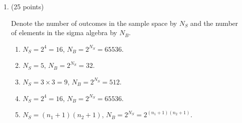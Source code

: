 \documentclass[12pt]{article}
\begin{document}
\begin{enumerate}
\item (25 points)

Denote the number of outcomes in the sample space
by $N_S$ and the number of elements in the sigma algebra by $N_B$.
\begin{enumerate}
\item
$N_S = 2^4 = 16$,
$N_B = 2^{N_S} = 65536$.

\item
$N_S = 5$,
$N_B = 2^{N_S} = 32$.

\item
$N_S = 3 \times 3 = 9$,
$N_B = 2^{N_S} = 512$.

\item
$N_S = 2^4 = 16$,
$N_B = 2^{N_S} = 65536$.

\item
$N_S = (n_1 + 1) (n_2 + 1)$,
$N_B = 2^{N_S} = 2^{(n_1 + 1)(n_2 + 1)}$.
\end{enumerate}

\end{enumerate}
\end{document}
